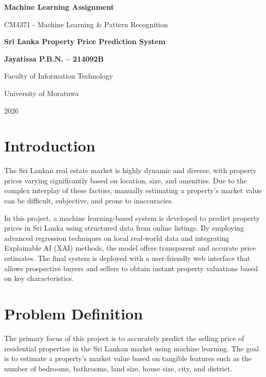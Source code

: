 \documentclass[12pt]{article}
\begin{document}
\begin{titlepage}
    \centering
    \vspace*{2cm}
    
    {\Large \textbf{Machine Learning Assignment} \par}
    \vspace{0.5cm}
    {\large CM4371 - Machine Learning \& Pattern Recognition \par}
    
    \vspace{6cm}
    
    {\Large \textbf{Sri Lanka Property Price Prediction System} \par}
    
    \vspace{1cm}
    {\Large \textbf{Jayatissa P.B.N. -- 214092B} \par}
    
    \vfill
    
    {\large Faculty of Information Technology \par}
    {\large University of Moratuwa \par}
    \vspace{0.5cm}
    {\large 2026 \par}
\end{titlepage}

\tableofcontents
\newpage

\section{Introduction}
The Sri Lankan real estate market is highly dynamic and diverse, with property prices varying significantly based on location, size, and amenities. Due to the complex interplay of these factors, manually estimating a property's market value can be difficult, subjective, and prone to inaccuracies.

In this project, a machine learning-based system is developed to predict property prices in Sri Lanka using structured data from online listings. By employing advanced regression techniques on local real-world data and integrating Explainable AI (XAI) methods, the model offers transparent and accurate price estimates. The final system is deployed with a user-friendly web interface that allows prospective buyers and sellers to obtain instant property valuations based on key characteristics.

\section{Problem Definition}
The primary focus of this project is to accurately predict the selling price of residential properties in the Sri Lankan market using machine learning. The goal is to estimate a property's market value based on tangible features such as the number of bedrooms, bathrooms, land size, house size, city, and district.
\end{document}
